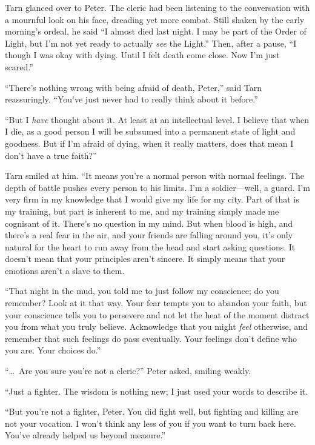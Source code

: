 Tarn glanced over to Peter.  The cleric had been listening to the conversation with a mournful look on his face, dreading yet more combat.  Still shaken by the early morning's ordeal, he said ``I almost died last night.  I may be part of the Order of Light, but I'm not yet ready to actually \emph{see} the Light.''  Then, after a pause, ``I though I was okay with dying.  Until I felt death come close.  Now I'm just scared.''

``There's nothing wrong with being afraid of death, Peter,'' said Tarn reassuringly.  ``You've just never had to really think about it before.''

``But I \emph{have} thought about it.  At least at an intellectual level.  I believe that when I die, as a good person I will be subsumed into a permanent state of light and goodness.  But if I'm afraid of dying, when it really matters, does that mean I don't have a true faith?''

Tarn smiled at him.  ``It means you're a normal person with normal feelings.  The depth of battle pushes every person to his limits.  I'm a soldier---well, a guard.  I'm very firm in my knowledge that I would give my life for my city.  Part of that is my training, but part is inherent to me, and my training simply made me cognisant of it.  There's no question in my mind.  But when blood is high, and there's a real fear in the air, and your friends are falling around you, it's only natural for the heart to run away from the head and start asking questions.  It doesn't mean that your principles aren't sincere.  It simply means that your emotions aren't a slave to them.

``That night in the mud, you told me to just follow my conscience; do you remember?  Look at it that way.  Your fear tempts you to abandon your faith, but your conscience tells you to persevere and not let the heat of the moment distract you from what you truly believe.  Acknowledge that you might \emph{feel} otherwise, and remember that such feelings do pass eventually.  Your feelings don't define who you are.  Your choices do.''

``\ldots\ Are you sure you're not a cleric?'' Peter asked, smiling weakly.

``Just a fighter.  The wisdom is nothing new; I just used your words to describe it.

``But you're not a fighter, Peter.  You did fight well, but fighting and killing are not your vocation.  I won't think any less of you if you want to turn back here.  You've already helped us beyond measure.''

